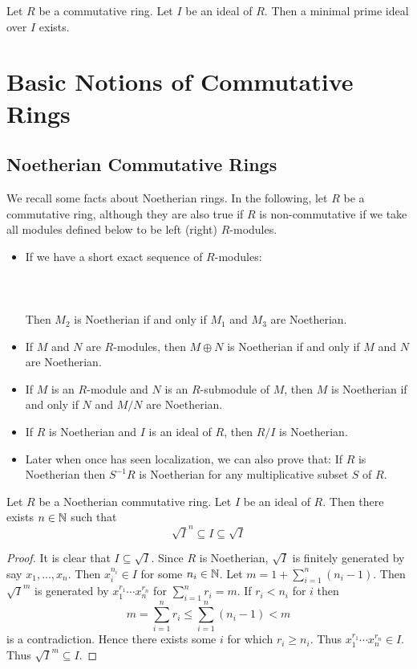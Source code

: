 \documentclass[a4paper]{article}
\begin{document}
\begin{prp}{}{} Let $R$ be a commutative ring. Let $I$ be an ideal of $R$. Then a minimal prime ideal over $I$ exists. 
\end{prp}

\pagebreak
\section{Basic Notions of Commutative Rings}
\subsection{Noetherian Commutative Rings}
We recall some facts about Noetherian rings. In the following, let $R$ be a commutative ring, although they are also true if $R$ is non-commutative if we take all modules defined below to be left (right) $R$-modules. 

\begin{itemize}
\item If we have a short exact sequence of $R$-modules: \\~\\
\\~\\
Then $M_2$ is Noetherian if and only if $M_1$ and $M_3$ are Noetherian. 
\item If $M$ and $N$ are $R$-modules, then $M\oplus N$ is Noetherian if and only if $M$ and $N$ are Noetherian. 
\item If $M$ is an $R$-module and $N$ is an $R$-submodule of $M$, then $M$ is Noetherian if and only if $N$ and $M/N$ are Noetherian.
\item If $R$ is Noetherian and $I$ is an ideal of $R$, then $R/I$ is Noetherian. 
\item Later when once has seen localization, we can also prove that: If $R$ is Noetherian then $S^{-1}R$ is Noetherian for any multiplicative subset $S$ of $R$. 
\end{itemize}

\begin{prp}{}{} Let $R$ be a Noetherian commutative ring. Let $I$ be an ideal of $R$. Then there exists $n\in\mathbb{N}$ such that $$\sqrt{I}^n\subseteq I\subseteq\sqrt{I}$$ 
\begin{proof}
It is clear that $I\subseteq\sqrt{I}$. Since $R$ is Noetherian, $\sqrt{I}$ is finitely generated by say $x_1,\dots,x_n$. Then $x_i^{n_i}\in I$ for some $n_i\in\mathbb{N}$. Let $m=1+\sum_{i=1}^n(n_i-1)$. Then $\sqrt{I}^m$ is generated by $x_1^{r_1}\cdots x_n^{r_n}$ for $\sum_{i=1}^nr_i=m$. If $r_i<n_i$ for $i$ then $$m=\sum_{i=1}^nr_i\leq\sum_{i=1}^n(n_i-1)<m$$ is a contradiction. Hence there exists some $i$ for which $r_i\geq n_i$. Thus $x_1^{r_1}\cdots x_n^{r_n}\in I$. Thus $\sqrt{I}^m\subseteq I$. 
\end{proof}
\end{prp}
\end{document}
